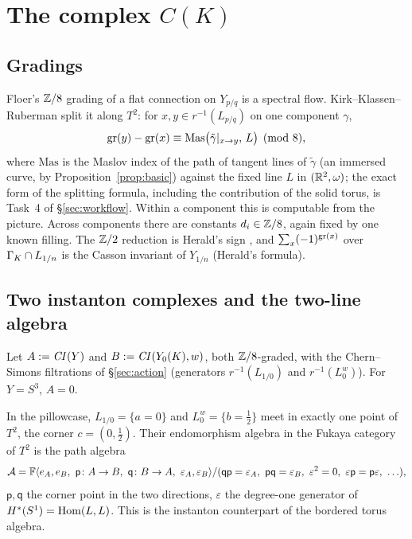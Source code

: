\section{The complex $C(K)$}\label{sec:complex}
\subsection{Gradings}
Floer's $\mathbb{Z}/8$ grading of a flat connection on $Y_{p/q}$ is a spectral flow.  Kirk--Klassen--Ruberman
\cite{KKR} split it along $T^2$: for $x,y\in r^{-1}(L_{p/q})$ on one component $\gamma$,
\[
\mathrm{gr}(y)-\mathrm{gr}(x)\equiv\mathrm{Mas}\big(\tilde\gamma|_{x\to y},\,L\big)\pmod 8,
\]
where $\mathrm{Mas}$ is the Maslov index of the path of tangent lines of $\tilde\gamma$ (an immersed curve, by
Proposition~\ref{prop:basic}) against the fixed line $L$ in $(\mathbb{R}^2,\omega)$; the exact form of the splitting
formula, including the contribution of the solid torus, is Task~4 of \S\ref{sec:workflow}.
Within a component this is computable from the picture.  Across components there are constants
$d_i\in\mathbb{Z}/8$, again fixed by one known filling.  The $\mathbb{Z}/2$ reduction is Herald's sign \cite{Herald}, and
$\sum_x(-1)^{\mathrm{gr}(x)}$ over $\Gamma_K\cap L_{1/n}$ is the Casson invariant of $Y_{1/n}$ (Herald's formula).

\subsection{Two instanton complexes and the two-line algebra}
Let $A:=\mathit{CI}(Y)$ and $B:=\mathit{CI}(Y_0(K),w)$, both $\mathbb{Z}/8$-graded, with the Chern--Simons filtrations of \S\ref{sec:action}
(generators $r^{-1}(L_{1/0})$ and $r^{-1}(L_0^w)$).  For $Y=S^3$, $A=0$.

In the pillowcase, $L_{1/0}=\{a=0\}$ and $L_0^w=\{b=\tfrac12\}$ meet in exactly one point of $T^2$, the corner
$c=(0,\tfrac12)$.  Their endomorphism algebra in the Fukaya category of $T^2$ is the path algebra
\[
\cA=\F\langle e_A,e_B,\ \mathsf p\colon A\to B,\ \mathsf q\colon B\to A,\ \varepsilon_A,\varepsilon_B\rangle/
(\mathsf q\mathsf p=\varepsilon_A,\ \mathsf p\mathsf q=\varepsilon_B,\ \varepsilon^2=0,\ \varepsilon\mathsf p=\mathsf p\varepsilon,\ \ldots),
\]
$\mathsf p,\mathsf q$ the corner point in the two directions, $\varepsilon$ the degree-one generator of
$H^*(S^1)=\operatorname{Hom}(L,L)$.  This is the instanton counterpart of the bordered torus algebra.

